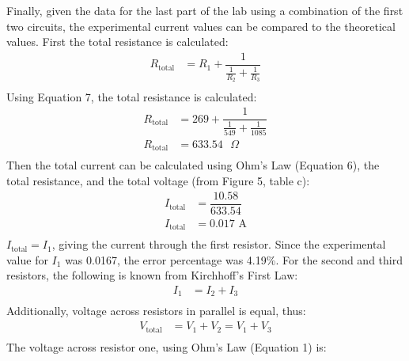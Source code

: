 \documentclass [12pt, letterpaper, twoside] {article}
\begin{document}
Finally, given the data for the last part of the lab using a combination of the first two circuits, the experimental current values can be compared to the theoretical values. First the total resistance is calculated:
\begin{equation}
  \begin{split}
    R_{\text{total}} &= R_{1} + \dfrac{1}{\tfrac{1}{R_{2}} + \tfrac{1}{R_{3}}} \\
  \end{split}
\end{equation}
Using Equation 7, the total resistance is calculated:
\begin{equation*}
  \begin{split}
    R_{\text{total}} &= 269 + \dfrac{1}{\tfrac{1}{549} + \tfrac{1}{1085}} \\
    R_{\text{total}} &= 633.54\text{ }\Omega \\ %
  \end{split}
\end{equation*}
Then the total current can be calculated using Ohm's Law (Equation 6), the total resistance, and the total voltage (from Figure 5, table c):
\begin{equation*}
  \begin{split}
    I_{\text{total}} &= \dfrac{10.58}{633.54} \\
    I_{\text{total}} &= 0.017\text{ A} \\ %
  \end{split}
\end{equation*}
\(I_{\text{total}} = I_{1}\), giving the current through the first resistor. Since the experimental value for \(I_{1}\) was 0.0167, the error percentage was 4.19\%. For the second and third resistors, the following is known from Kirchhoff's First Law: %
\begin{equation}
  \begin{split}
    I_{1} &= I_{2} + I_{3} \\
  \end{split}
\end{equation}
Additionally, voltage across resistors in parallel is equal, thus:
\begin{equation}
  \begin{split}
    V_{\text{total}} &= V_{1} + V_{2} = V_{1} + V_{3} \\
  \end{split}
\end{equation}
The voltage across resistor one, using Ohm's Law (Equation 1) is:
\end{document}
